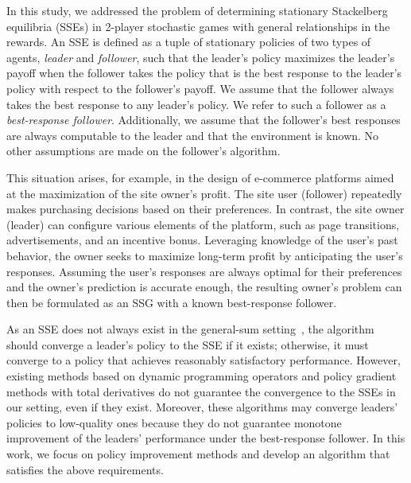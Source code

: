 \documentclass{acml}
\begin{document}
In this study, we addressed the problem of determining stationary Stackelberg equilibria (SSEs) in 2-player stochastic games with general relationships in the rewards.
An SSE is defined as a tuple of stationary policies of two types of agents, \emph{leader} and \emph{follower}, such that the leader's policy maximizes the leader's payoff when the follower takes the policy that is the best response to the leader's policy with respect to the follower's payoff.
We assume that the follower always takes the best response to any leader's policy. We refer to such a follower as a \emph{best-response follower}.
Additionally, we assume that the follower's best responses are always computable to the leader and that the environment is known. 
No other assumptions are made on the follower's algorithm.

This situation arises, for example, in the design of e-commerce platforms aimed at the maximization of the site owner's profit.
The site user (follower) repeatedly makes purchasing decisions based on their preferences. In contrast, the site owner (leader) can configure various elements of the platform, such as page transitions, advertisements, and an incentive bonus.
Leveraging knowledge of the user's past behavior, the owner seeks to maximize long-term profit by anticipating the user's responses.
Assuming the user's responses are always optimal for their preferences and the owner's prediction is accurate enough, the resulting owner's problem can then be formulated as an SSG with a known best-response follower.


As an SSE does not always exist in the general-sum setting~\citep{Bucarey2022-ro}, the algorithm should converge a leader's policy to the SSE if it exists; otherwise, it must converge to a policy that achieves reasonably satisfactory performance.
However, existing methods based on dynamic programming operators \citep{Bucarey2022-ro,Zhang2020-hw} and policy gradient methods with total derivatives \citep{Zheng2022-xj,vu2022stackelberg} do not guarantee the convergence to the SSEs in our setting, even if they exist. 
Moreover, these algorithms may converge leaders’ policies to low-quality ones because they do not guarantee monotone improvement of the leaders’ performance under the best-response follower.
In this work, we focus on policy improvement methods and develop an algorithm that satisfies the above requirements.
\end{document}

